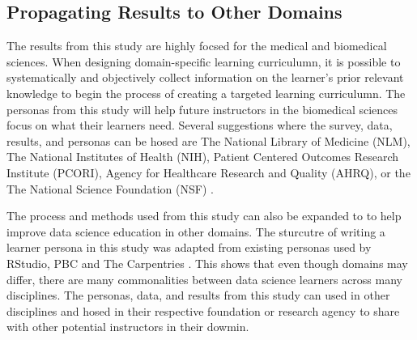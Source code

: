 \documentclass[020-persona\_validation.tex]{subfiles}
\begin{document}
    \subsection{Propagating Results to Other Domains}

        The results from this study are highly focsed for the medical and biomedical sciences.
        When designing domain-specific learning curriculumn, it is possible to systematically
        and objectively collect information on the learner's prior relevant knowledge to begin the process of
        creating a targeted learning curriculumn.
        The personas from this study will help future instructors in the biomedical sciences
        focus on what their learners need.
        Several suggestions where the survey, data, results, and personas can be hosed are
        The National Library of Medicine (NLM),
        The National Institutes of Health (NIH),
        Patient Centered Outcomes Research Institute (PCORI),
        Agency for Healthcare Research and Quality (AHRQ), or the
        The National Science Foundation (NSF)
        \cite{payneBiomedicalInformaticsMeets2018}.

        The process and methods used from this study can also be expanded to
        to help improve data science education in other domains.
        The sturcutre of writing a learner persona in this study was adapted from existing personas
        used by RStudio, PBC and The Carpentries
        \cite{rstudioLearnerPersonas2019, softwarecarpentryLearnerProfiles}.
        This shows that even though domains may differ,
        there are many commonalities between data science learners across many disciplines.
        The personas, data, and results from this study can used in other disciplines and
        hosed in their respective foundation or research agency to share with other potential instructors
        in their dowmin.
\end{document}
